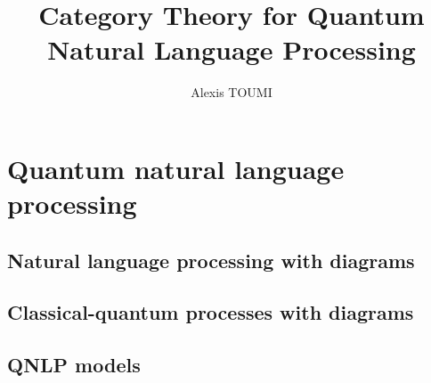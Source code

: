 

\title{Category Theory for Quantum\\
Natural Language Processing}
\author{Alexis TOUMI}

\degreedate{\today}




%
% 
%
%
%
%
% 
% 
% 
% 
%
%
% 
% 
% 





\chapter{Quantum natural language processing} \label{chapter-2:qnlp}

\section{Natural language processing with diagrams}
\section{Classical-quantum processes with diagrams}
\section{QNLP models}
